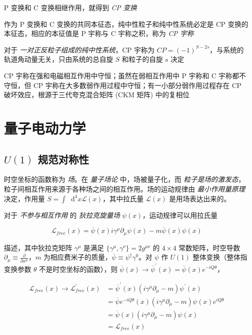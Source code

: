 \documentclass[oneside,a4paper,openany,11pt]{ctexbook}
\newcommand*{\dif}{\mathop{}\!\mathrm{d}} %
\begin{document}
P 变换和 C 变换相继作用，就得到 \emph{CP 变换}

作为 P 变换和 C 变换的共同本征态，纯中性粒子和纯中性系统必定是 CP 变换的本征态，相应的本征值是 P 宇称与 C 宇称之积，称为 \emph{CP 宇称}

对于 \emph{一对正反粒子组成的纯中性系统}，CP 宇称为 $CP = (-1)^{S-2s}$，与系统的轨道角动量无关，只由系统的总自旋 $S$ 和粒子的自旋 $s$ 决定

CP 宇称在强和电磁相互作用中守恒；虽然在弱相互作用中 P 宇称和 C 宇称都不守恒，但 CP 宇称在大多数弱作用过程中守恒；有一小部分弱作用过程存在 CP 破坏效应，根源于三代夸克混合矩阵 (CKM 矩阵) 中的复相位

\section{量子电动力学}

\subsection{$U(1)$ 规范对称性}

时空坐标的函数称为 \emph{场}。在 \emph{量子场论} 中，场被量子化，而 \emph{粒子是场的激发态}，粒子间相互作用来源于各种场之间的相互作用。场的运动规律由 \emph{最小作用量原理} 决定，作用量 $S=\int \dif^4 x \mathcal{L}(x)$，其中拉氏量 $\mathcal{L}(x)$ 是用场表达出来的。

对于 \emph{不参与相互作用} 的 \emph{狄拉克旋量场} $\psi(x)$，运动规律可以用拉氏量

\begin{equation}
    \mathcal{L}_{free}(x) = \overline{\psi}(x) i \gamma^\mu \partial_\mu \psi(x) - m \overline{\psi}(x) \psi(x)
\end{equation}

描述，其中狄拉克矩阵 $\gamma^\mu$ 是满足 $\{\gamma^\mu, \gamma^\nu\}=2 g^{\mu\nu}$ 的 $4 \times 4$ 常数矩阵，时空导数 $\partial_\mu \equiv \frac{\partial}{\partial x^\mu}$，$m$ 为相应费米子的质量，$\overline{\psi} \equiv \psi^\dagger \gamma^0$。对 $\psi$ 作 $U(1)$ 整体变换（整体指变换参数 $\theta$ 不是时空坐标的函数），则 $\overline{\psi}(x) \to \overline{\psi}^\prime (x) = \overline{\psi}(x) e^{-iQ\theta}$，

\begin{align}
    \mathcal{L}_{free} (x) \to \mathcal{L}_{free}^\prime (x) &= \overline{\psi}^\prime (x) (i \gamma^\mu \partial_\mu - m) \psi^\prime(x) \\
    &= \overline{\psi} e^{-iQ\theta} (x) (i \gamma^\mu \partial_\mu - m) \psi(x) e^{iQ\theta} \\
    &= \overline{\psi}(x) (i \gamma^\mu \partial_\mu - m) \psi(x) \\
    &= \mathcal{L}_{free} (x)
\end{align}
\end{document}
